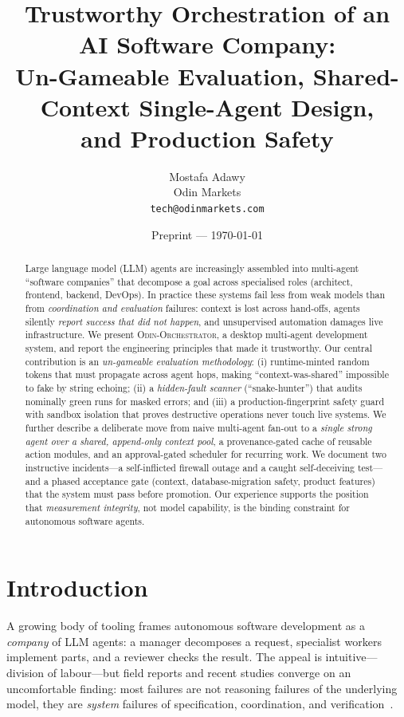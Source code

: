\documentclass[10pt,twocolumn]{article}
\title{\vspace{-2.2em}\textbf{\large Trustworthy Orchestration of an AI Software Company:\\
Un-Gameable Evaluation, Shared-Context Single-Agent Design,\\ and Production Safety}}
\author{\normalsize Mostafa Adawy\\[-2pt]
  \small Odin Markets \\[-2pt]
  \small \texttt{tech@odinmarkets.com}}
\date{\vspace{-1.2em}\small Preprint --- \today}
\begin{document}
\maketitle

\begin{abstract}
\small
Large language model (LLM) agents are increasingly assembled into multi-agent
``software companies'' that decompose a goal across specialised roles
(architect, frontend, backend, DevOps). In practice these systems fail less
from weak models than from \emph{coordination and evaluation} failures:
context is lost across hand-offs, agents silently \emph{report success that did
not happen}, and unsupervised automation damages live infrastructure. We
present \textsc{Odin-Orchestrator}, a desktop multi-agent development system,
and report the engineering principles that made it trustworthy. Our central
contribution is an \emph{un-gameable evaluation methodology}: (i) runtime-minted
random tokens that must propagate across agent hops, making
``context-was-shared'' impossible to fake by string echoing; (ii) a
\emph{hidden-fault scanner} (``snake-hunter'') that audits nominally green runs
for masked errors; and (iii) a production-fingerprint safety guard with
sandbox isolation that proves destructive operations never touch live systems.
We further describe a deliberate move from naive multi-agent fan-out to a
\emph{single strong agent over a shared, append-only context pool}, a
provenance-gated cache of reusable action modules, and an approval-gated
scheduler for recurring work. We document two instructive incidents---a
self-inflicted firewall outage and a caught self-deceiving test---and a phased
acceptance gate (context, database-migration safety, product features) that the
system must pass before promotion. Our experience supports the position that
\emph{measurement integrity}, not model capability, is the binding constraint
for autonomous software agents.
\end{abstract}

\section{Introduction}
A growing body of tooling frames autonomous software development as a
\emph{company} of LLM agents: a manager decomposes a request, specialist
workers implement parts, and a reviewer checks the result. The appeal is
intuitive---division of labour---but field reports and recent studies converge
on an uncomfortable finding: most failures are not reasoning failures of the
underlying model, they are \emph{system} failures of specification,
coordination, and verification~\cite{mast,cognition,anthropic}.
\end{document}
